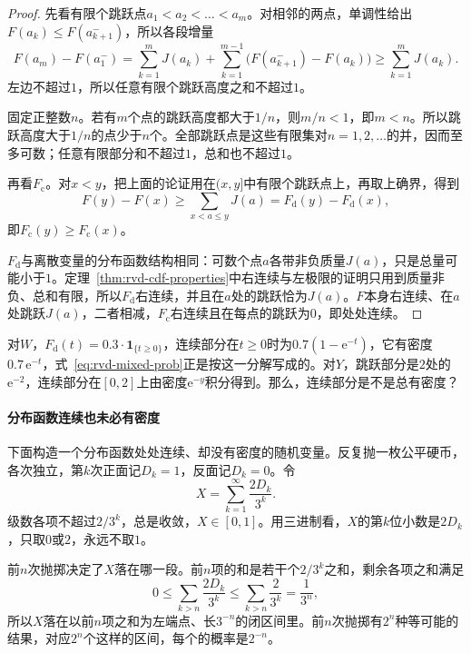 \begin{proof}
先看有限个跳跃点$a_1<a_2<\dots<a_m$。对相邻的两点，单调性给出$F(a_k)\leq F(a_{k+1}^{-})$，所以各段增量
\[
  F(a_m)-F(a_1^{-})=\sum_{k=1}^{m}J(a_k)+\sum_{k=1}^{m-1}\bigl(F(a_{k+1}^{-})-F(a_k)\bigr)\geq\sum_{k=1}^{m}J(a_k).
\]
左边不超过$1$，所以任意有限个跳跃高度之和不超过$1$。

固定正整数$n$。若有$m$个点的跳跃高度都大于$1/n$，则$m/n<1$，即$m<n$。所以跳跃高度大于$1/n$的点少于$n$个。全部跳跃点是这些有限集对$n=1,2,\dots$的并，因而至多可数；任意有限部分和不超过$1$，总和也不超过$1$。

再看$F_{\mathrm{c}}$。对$x<y$，把上面的论证用在$(x,y]$中有限个跳跃点上，再取上确界，得到
\[
  F(y)-F(x)\geq\sum_{x<a\leq y}J(a)=F_{\mathrm{d}}(y)-F_{\mathrm{d}}(x),
\]
即$F_{\mathrm{c}}(y)\geq F_{\mathrm{c}}(x)$。

$F_{\mathrm{d}}$与离散变量的分布函数结构相同：可数个点$a$各带非负质量$J(a)$，只是总量可能小于$1$。定理~\ref{thm:rvd-cdf-properties}中右连续与左极限的证明只用到质量非负、总和有限，所以$F_{\mathrm{d}}$右连续，并且在$a$处的跳跃恰为$J(a)$。$F$本身右连续、在$a$处跳跃$J(a)$，二者相减，$F_{\mathrm{c}}$右连续且在每点的跳跃为$0$，即处处连续。
\end{proof}

对$W$，$F_{\mathrm{d}}(t)=0.3\cdot\mathbf{1}_{\{t\geq0\}}$，连续部分在$t\geq0$时为$0.7(1-\mathrm{e}^{-t})$，它有密度$0.7\,\mathrm{e}^{-t}$，式~\eqref{eq:rvd-mixed-prob}正是按这一分解写成的。对$Y$，跳跃部分是$2$处的$\mathrm{e}^{-2}$，连续部分在$[0,2]$上由密度$\mathrm{e}^{-y}$积分得到。那么，连续部分是不是总有密度？

\paragraph{分布函数连续也未必有密度}
下面构造一个分布函数处处连续、却没有密度的随机变量。反复抛一枚公平硬币，各次独立，第$k$次正面记$D_k=1$，反面记$D_k=0$。令
\begin{equation}
  X=\sum_{k=1}^{\infty}\frac{2D_k}{3^{k}} .
  \label{eq:rvd-cantor}
\end{equation}
级数各项不超过$2/3^{k}$，总是收敛，$X\in[0,1]$。用三进制看，$X$的第$k$位小数是$2D_k$，只取$0$或$2$，永远不取$1$。

前$n$次抛掷决定了$X$落在哪一段。前$n$项的和是若干个$2/3^{k}$之和，剩余各项之和满足
\[
  0\leq\sum_{k>n}\frac{2D_k}{3^{k}}\leq\sum_{k>n}\frac{2}{3^{k}}=\frac{1}{3^{n}},
\]
所以$X$落在以前$n$项之和为左端点、长$3^{-n}$的闭区间里。前$n$次抛掷有$2^{n}$种等可能的结果，对应$2^{n}$个这样的区间，每个的概率是$2^{-n}$。

